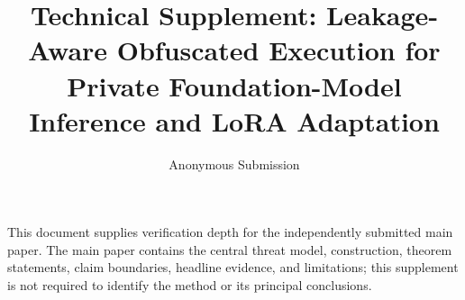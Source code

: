 \documentclass[letterpaper]{article} %
\title{Technical Supplement: Leakage-Aware Obfuscated Execution for Private
Foundation-Model Inference and LoRA Adaptation}
\author{Anonymous Submission}
\begin{document}
\maketitle

This document supplies verification depth for the independently submitted main
paper. The main paper contains the central threat model, construction, theorem
statements, claim boundaries, headline evidence, and limitations; this
supplement is not required to identify the method or its principal conclusions.







\end{document}
